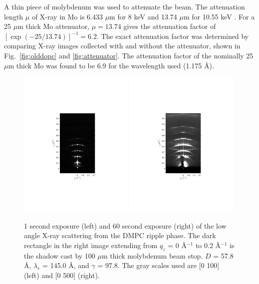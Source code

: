 A thin piece of molybdenum was used to attenuate the beam. The attenuation length
$\mu$ of X-ray in Mo is 6.433 $\mu$m for 8 keV and 13.74 $\mu$m for 10.55 keV 
\cite{ref:cxro}.
For a 25 $\mu$m thick Mo attenuator, $\mu=13.74$ gives the attenuation factor 
of $[\exp(-25/13.74)]^{-1} = 6.2$. The exact attenuation factor was determined
by comparing X-ray images collected with and without the attenuator, 
shown in Fig.~\ref{fig:olddopc} and \ref{fig:attenuator}.
The attenuation factor of the nominally 25 $\mu$m thick Mo was found to 
be 6.9 for the wavelength used (1.175 \AA). 

\begin{figure}[htbp]
  \centering
  \includegraphics[trim=160 180 160 180,clip,width=0.49\textwidth]{figures/ripple/ripple083}
  \includegraphics[trim=160 180 160 180,clip,width=0.49\textwidth]{figures/ripple/ripple085}
  \caption{1 second exposure (left) and 60 second exposure (right) of the low
  angle X-ray scattering from the DMPC ripple phase. The dark rectangle 
  in the right image extending from $q_z$ = 0 \AA$^{-1}$ to 0.2 \AA$^{-1}$
  is the shadow cast by 100 $\mu$m thick molybdenum beam stop.
  $D$ = 57.8 \AA, $\lambda_r$ = 145.0 \AA, and $\gamma$ = 97.8\textdegree.
  The gray scales used are [0 100] (left) and [0 500] (right).}
  \label{fig:ripple_laxs_images}  
\end{figure} 

